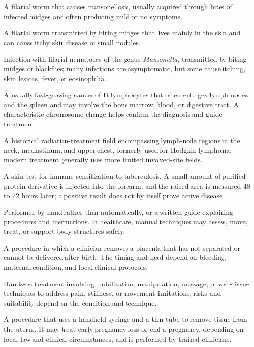  A filarial worm that causes mansonellosis, usually acquired through bites of infected midges and often producing mild or no symptoms.

 A filarial worm transmitted by biting midges that lives mainly in the skin and can cause itchy skin disease or small nodules.

 Infection with filarial nematodes of the genus \textit{Mansonella}, transmitted by biting midges or blackflies; many infections are asymptomatic, but some cause itching, skin lesions, fever, or eosinophilia.

 A usually fast-growing cancer of B lymphocytes that often enlarges lymph nodes and the spleen and may involve the bone marrow, blood, or digestive tract. A characteristic chromosome change helps confirm the diagnosis and guide treatment.

 A historical radiation-treatment field encompassing lymph-node regions in the neck, mediastinum, and upper chest, formerly used for Hodgkin lymphoma; modern treatment generally uses more limited involved-site fields.

 A skin test for immune sensitization to tuberculosis. A small amount of purified protein derivative is injected into the forearm, and the raised area is measured 48 to 72 hours later; a positive result does not by itself prove active disease.

 Performed by hand rather than automatically, or a written guide explaining procedures and instructions. In healthcare, manual techniques may assess, move, treat, or support body structures safely.

 A procedure in which a clinician removes a placenta that has not separated or cannot be delivered after birth. The timing and need depend on bleeding, maternal condition, and local clinical protocols.

 Hands-on treatment involving mobilization, manipulation, massage, or soft-tissue techniques to address pain, stiffness, or movement limitations; risks and suitability depend on the condition and technique.

 A procedure that uses a handheld syringe and a thin tube to remove tissue from the uterus. It may treat early pregnancy loss or end a pregnancy, depending on local law and clinical circumstances, and is performed by trained clinicians.

